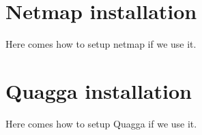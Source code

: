 
\chapter{Netmap installation}
Here comes how to setup netmap if we use it.


\chapter{Quagga installation}
Here comes how to setup Quagga if we use it.
